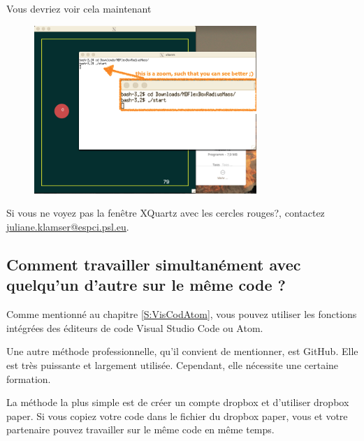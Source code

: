 \documentclass{article}
\begin{document}
Vous devriez voir cela maintenant
\begin{figure}[H]
\center
\includegraphics[width=0.75\textwidth]{Plots/XQuartzFinal.png}
\end{figure}

Si vous ne voyez pas la fenêtre XQuartz avec les cercles rouges?, contactez \href{mailto:example@example.com}{juliane.klamser@espci.psl.eu}.

\subsection{Comment travailler simultanément avec quelqu'un d'autre sur le même code ?}
Comme mentionné au chapitre \ref{S:VisCodAtom}, vous pouvez utiliser les fonctions intégrées des éditeurs de code Visual Studio Code ou Atom. 

Une autre méthode professionnelle, qu'il convient de mentionner, est GitHub. Elle est très puissante et largement utilisée. Cependant, elle nécessite une certaine formation.

La méthode la plus simple est de créer un compte dropbox et d'utiliser dropbox paper. Si vous copiez votre code dans le fichier du dropbox paper, vous et votre partenaire pouvez travailler sur le même code en même temps.
%  
\end{document}

